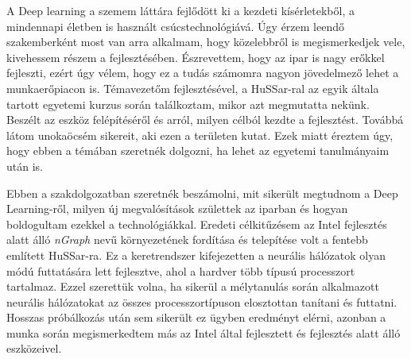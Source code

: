 A Deep learning a szemem láttára fejlődött ki a kezdeti kísérletekből, a mindennapi életben is használt csúcstechnológiává. Úgy érzem leendő szakemberként most van arra alkalmam, hogy közelebbről is megismerkedjek vele, kivehessem részem a fejlesztésében. Észrevettem, hogy az ipar is nagy erőkkel fejleszti, ezért úgy vélem, hogy ez a tudás számomra nagyon jövedelmező lehet a munkaerőpiacon is.
Témavezetőm fejlesztésével, a HuSSar-ral az egyik általa tartott egyetemi kurzus során találkoztam, mikor azt megmutatta nekünk. Beszélt az eszköz felépítéséről és arról, milyen célból kezdte a fejlesztést. Továbbá látom unokaöcsém sikereit, aki ezen a területen kutat. Ezek miatt éreztem úgy, hogy ebben a témában szeretnék dolgozni, ha lehet az egyetemi tanulmányaim után is.

Ebben a szakdolgozatban szeretnék beszámolni, mit sikerült megtudnom a Deep Learning-ről, milyen új megvalósítások születtek az iparban és hogyan boldogultam ezekkel a technológiákkal. Eredeti célkitűzésem az Intel fejlesztés alatt álló \emph{nGraph} nevű környezetének fordítása és telepítése volt a fentebb említett HuSSar-ra. Ez a keretrendszer kifejezetten a neurális hálózatok olyan módú futtatására lett fejlesztve, ahol a hardver több típusú processzort tartalmaz.
Ezzel szerettük volna, ha sikerül a mélytanulás során alkalmazott neurális hálózatokat az összes processzortípuson elosztottan tanítani és futtatni. Hosszas próbálkozás után sem sikerült ez ügyben eredményt elérni, azonban a munka során megismerkedtem más az Intel által fejlesztett és fejlesztés alatt álló eszközeivel.
